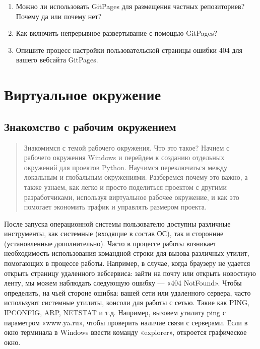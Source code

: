 \documentclass[letterpaper,10pt,russian]{sphinxmanual}
\begin{document}
\begin{enumerate}
\item {} 
\sphinxAtStartPar
Можно ли использовать GitPages для размещения частных репозиториев? Почему да или почему нет?

\item {} 
\sphinxAtStartPar
Как включить непрерывное развертывание с помощью GitPages?

\item {} 
\sphinxAtStartPar
Опишите процесс настройки пользовательской страницы ошибки 404 для вашего веб\sphinxhyphen{}сайта GitPages.

\end{enumerate}


\chapter{Виртуальное окружение}
\label{\detokenize{index:id11}}
\sphinxstepscope


\section{Знакомство с рабочим окружением}
\label{\detokenize{educational_materials/path_venv/content:id1}}\label{\detokenize{educational_materials/path_venv/content::doc}}
\sphinxAtStartPar
{}

\sphinxAtStartPar
{}
\begin{quote}

\sphinxAtStartPar
Знакомимся с темой рабочего окружения. Что это такое? Начнем с рабочего окружения Windows и перейдем к созданию отдельных окружений для проектов Python. Научимся переключаться между локальным и глобальным окружениями. Разберемся почему это важно, а также узнаем, как легко и просто поделиться проектом с другими разработчиками, используя виртуальное рабочее окружение, и как это помогает экономить трафик и управлять размером проекта.
\end{quote}

\sphinxAtStartPar
После запуска операционной системы пользователю доступны различные инструменты, как системные (входящие в состав ОС), так и сторонние (установленные дополнительно). Часто в процессе работы возникает необходимость использования командной строки для вызова различных утилит, помогающих в процессе работы. Например, в случае, когда браузеру не удается открыть страницу удаленного веб\sphinxhyphen{}сервиса: зайти на почту или открыть новостную ленту, мы можем наблюдать следующую ошибку — «404 NotFound». Чтобы определить, на чьей стороне ошибка: вашей сети или удаленного сервера, часто используют системные утилиты, консоли для работы с сетью. Такие как PING, IPCONFIG, ARP, NETSTAT и т.д. Например, вызовем утилиту ping с параметром «www.ya.ru», чтобы проверить наличие связи с серверами. Если в окно терминала в Windows ввести команду «explorer», откроется графическое окно.
\end{document}
